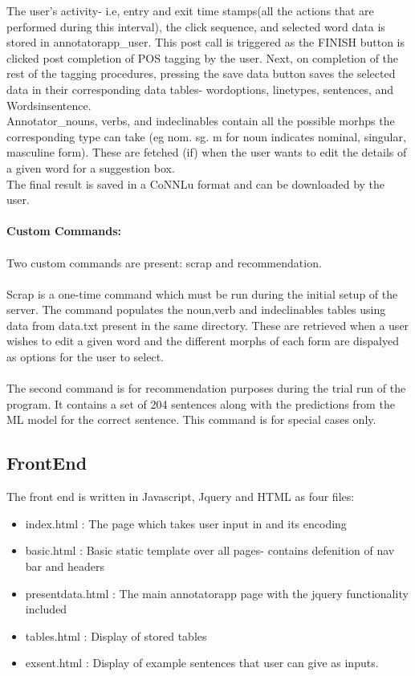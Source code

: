 \documentclass[12pt]{article}
\begin{document}
The user's activity- i.e, entry and exit time stamps(all the actions that are performed during this interval), the click sequence, and selected word data is stored in annotatorapp\_user. This post call is triggered as the FINISH button is clicked post completion of POS tagging by the user. Next, on completion of the rest of the tagging procedures, pressing the save data button saves the selected data in their corresponding data tables- wordoptions, linetypes, sentences, and Wordsinsentence. \\ 

Annotator\_nouns, verbs, and indeclinables contain all the possible morhps the corresponding type can take (eg nom. sg. m for noun indicates nominal, singular, masculine form). These are fetched (if) when the user wants to edit the details of a given word for a suggestion box.  \\

The final result is saved in a CoNNLu format and can be downloaded by the user.\\
\\ \textbf{Custom Commands:}\\
\\ Two custom commands are present: scrap and recommendation. \\ \\Scrap is a one-time command which must be run during the initial setup of the server. The command populates the noun,verb and indeclinables tables using data from data.txt present in the same directory. These are retrieved when a user wishes to edit a given word and the different morphs of each form are dispalyed as options for the user to select.\\ \\ The second command is for recommendation purposes during the trial run of the program. It contains a set of 204 sentences along with the predictions from the ML model for the correct sentence. This command is for special cases only.

\subsection{FrontEnd}
The front end is written in Javascript, Jquery and HTML as four files:
\begin{itemize}
	\item index.html : The page which takes user input in and its encoding
	\item basic.html : Basic static template over all pages- contains defenition of nav bar and headers
	\item presentdata.html : The main annotatorapp page with the jquery functionality included
	\item tables.html : Display of stored tables
	\item exsent.html : Display of example sentences that user can give as inputs.

\end{itemize}
\end{document}
